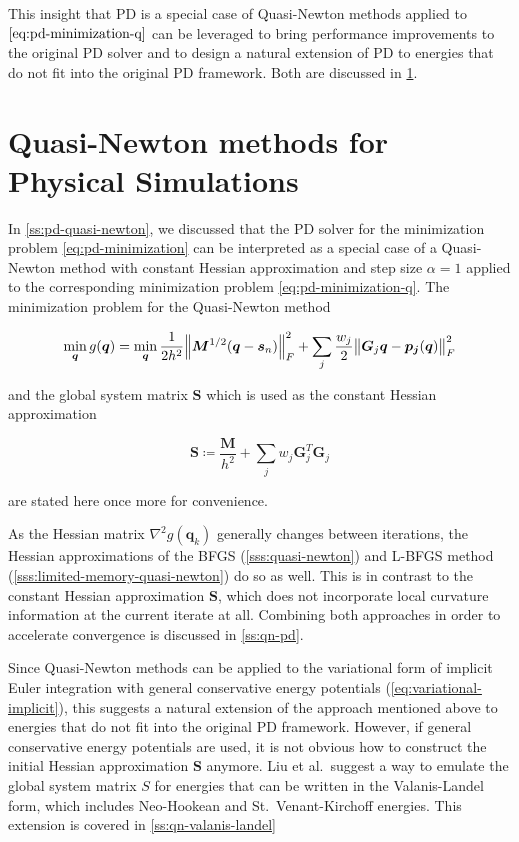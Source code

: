 This insight that PD is a special case of Quasi-Newton methods applied to $\cref{eq:pd-minimization-q}$ can be leveraged to
bring performance improvements to the original PD solver and to design a natural extension of PD to energies that do not fit 
into the original PD framework. Both are discussed in \cref{s:qn-rts}.

\section{Quasi-Newton methods for Physical Simulations}\label{s:qn-rts}
In \cref{ss:pd-quasi-newton}, we discussed that the PD solver for the minimization problem \cref{eq:pd-minimization}
can be interpreted as a special case of a Quasi-Newton method with constant Hessian approximation and step size $\alpha = 1$
applied to the corresponding minimization problem \cref{eq:pd-minimization-q}. The minimization problem for the Quasi-Newton
method

\begin{equation}\label{eq:pd-minimization-q2}
    \min_{\bm{q}} g(\bm{q}) = 
    \min_{\bm{q}} \frac{1}{2h^2} \norm{\bm{M}^{1/2}(\bm{q} - \bm{s}_n)}^2_F + \sum_j \frac{w_j}{2} \norm{\bm{G}_j\bm{q}
    - \bm{p_j}(\bm{q})}^2_F
\end{equation}

\noindent and the global system matrix $\bm{S}$ which is used as the constant Hessian approximation

\begin{equation}\label{eq:global-matrix}
    \bm{S} \coloneqq \frac{\bm{M}}{h^2} + \sum_j w_j \bm{G}_j^T \bm{G}_j  
\end{equation}

\noindent are stated here once more for convenience.

As the Hessian matrix $\nabla^2 g(\bm{q}_k)$ generally changes between iterations, the Hessian approximations of the 
BFGS (\cref{sss:quasi-newton}) and L-BFGS method (\cref{sss:limited-memory-quasi-newton}) do so as well.
This is in contrast to the constant Hessian approximation $\bm{S}$, which does not incorporate local curvature information
at the current iterate at all. Combining both approaches in order to accelerate convergence is discussed 
in \cref{ss:qn-pd}.

Since Quasi-Newton methods can be applied to the variational form of 
implicit Euler integration with general conservative energy potentials (\cref{eq:variational-implicit}), this suggests a 
natural extension of the approach mentioned above to energies that do not fit into the original PD framework. However,
if general conservative energy potentials are used, it is not obvious how to construct the initial Hessian approximation
$\bm{S}$ anymore. Liu et al.\ suggest a way to emulate the global system matrix $S$ for energies that can be written in
the Valanis-Landel form, which includes Neo-Hookean and St.\ Venant-Kirchoff energies. This extension is covered in 
\cref{ss:qn-valanis-landel}

